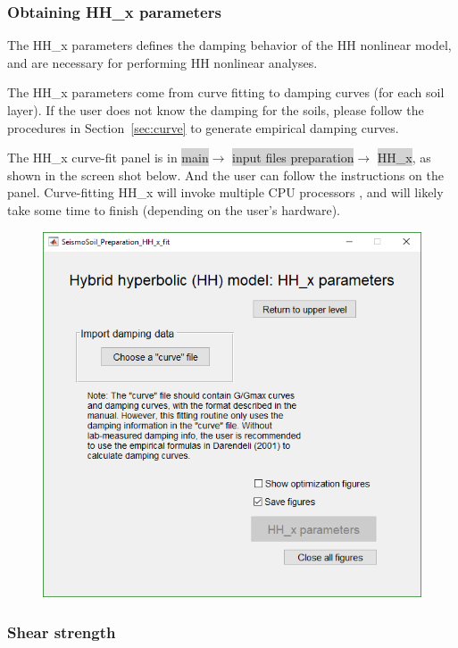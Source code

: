 \documentclass[11pt,letterpaper]{article}
\newcommand{\panel}[1]{\colorbox{lightgray}{\textsf{#1}}}
\begin{document}
\subsubsection{Obtaining \textsf{HH\_x} parameters}\label{sec:HH_x}

The \textsf{HH\_x} parameters defines the damping behavior of the HH nonlinear model, and are necessary for performing HH nonlinear analyses. 

The \textsf{HH\_x} parameters come from curve fitting to damping curves (for each soil layer). If the user does not know the damping for the soils, please follow the procedures in Section~\ref{sec:curve} to generate empirical damping curves.

The \textsf{HH\_x} curve-fit panel is in \panel{main}$\rightarrow$ \panel{input files preparation}$\rightarrow$ \panel{HH\_x}, as shown in the screen shot below. And the user can follow the instructions on the panel. Curve-fitting \textsf{HH\_x} will invoke multiple CPU processors , and will likely take some time to finish (depending on the user's hardware).

\begin{figure}[H]
    \centering
    \includegraphics[width=.80\textwidth]{HH_x_fit_panel.png}\\
\end{figure}


\subsubsection{Shear strength}\label{sec:strength}
\end{document}
